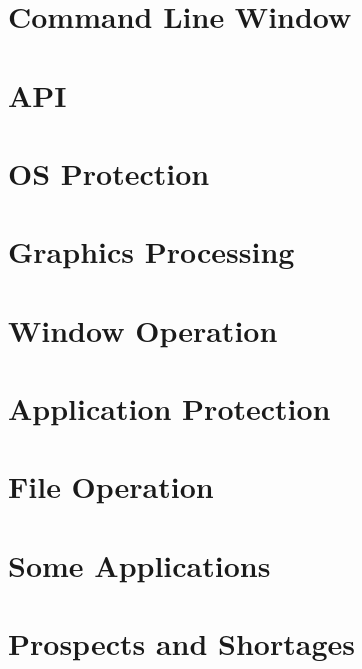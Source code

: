 \documentclass{swfcthesis}
\begin{document}
\section{Command Line Window}

\section{API}

\section{OS Protection}

\section{Graphics Processing}

\section{Window Operation}

\section{Application Protection}

\section{File Operation}

\section{Some Applications}

\section{Prospects and Shortages}


\Appendix{}
\printbibliography[heading={bibintoc},title={参考文献}] %
\advisorinfopage{}                 %
\acknowledgmentspage{}             %






\end{document}
